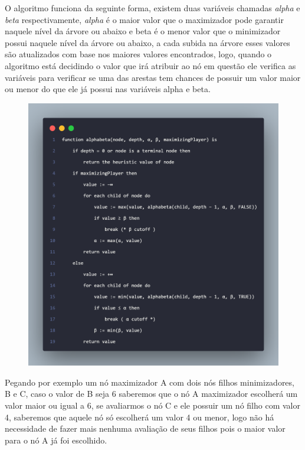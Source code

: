 O algoritmo funciona da seguinte forma, existem duas variáveis chamadas \textit{alpha} e \textit{beta} respectivamente,
\textit{alpha} é o maior valor que o maximizador pode garantir naquele nível da árvore ou abaixo e beta é o menor
valor que o minimizador possui naquele nível da árvore ou abaixo, a cada subida na árvore esses valores são
atualizados com base nos maiores valores encontrados, logo, quando o algoritmo está decidindo o valor que irá
atribuir ao nó em questão ele verifica as variáveis para verificar se uma das arestas tem chances de possuir
um valor maior ou menor do que ele já possui nas variáveis alpha e beta.
\begin{figure}[!htb]
    \centering
    \label{alphabeta-code}
    \includegraphics[scale=0.15]{figuras/alphabeta.png}
\end{figure}
Pegando por exemplo um nó maximizador A com dois nós filhos minimizadores, B e C,
caso o valor de B seja 6 saberemos que o nó A maximizador escolherá um valor maior ou igual a 6,
se avaliarmos o nó C e ele possuir um nó filho com valor 4, saberemos que aquele nó só escolherá um valor 4
ou menor, logo não há necessidade de fazer mais nenhuma avaliação de seus filhos pois o maior valor para o nó
A já foi escolhido.


